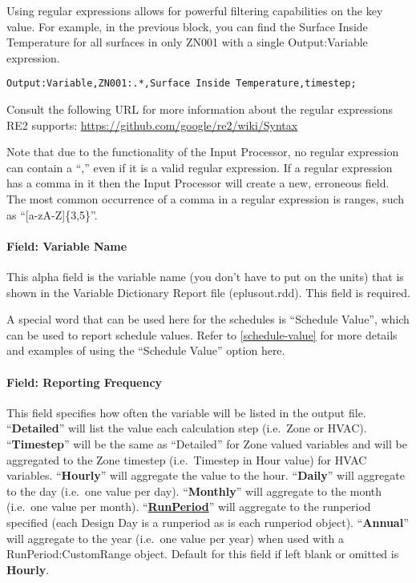 Using regular expressions allows for powerful filtering capabilities on the key value. For example, in the previous block, you can find the Surface Inside Temperature for all surfaces in only ZN001 with a single Output:Variable expression.

\begin{lstlisting}
Output:Variable,ZN001:.*,Surface Inside Temperature,timestep;
\end{lstlisting}

Consult the following URL for more information about the regular expressions RE2 supports: \url{https://github.com/google/re2/wiki/Syntax}

Note that due to the functionality of the Input Processor, no regular expression can contain a ``,'' even if it is a valid regular expression. If a regular expression has a comma in it then the Input Processor will create a new, erroneous field. The most common occurrence of a comma in a regular expression is ranges, such as ``[a-zA-Z]\{3,5\}''.

\paragraph{Field: Variable Name}\label{field-variable-name}

This alpha field is the variable name (you don't have to put on the units) that is shown in the Variable Dictionary Report file (eplusout.rdd). This field is required.

A special word that can be used here for the schedules is ``Schedule Value'', which can be used to report schedule values. Refer to \ref{schedule-value} for more details and examples of using the ``Schedule Value'' option here.

\paragraph{Field: Reporting Frequency}\label{field-reporting-frequency}

This field specifies how often the variable will be listed in the output file. ``\textbf{Detailed}'' will list the value each calculation step (i.e.~Zone or HVAC). ``\textbf{Timestep}'' will be the same as ``Detailed'' for Zone valued variables and will be aggregated to the Zone timestep (i.e.~Timestep in Hour value) for HVAC variables. ``\textbf{Hourly}'' will aggregate the value to the hour. ``\textbf{Daily}'' will aggregate to the day (i.e.~one value per day). ``\textbf{Monthly}'' will aggregate to the month (i.e.~one value per month). ``\textbf{\hyperref[runperiod]{RunPeriod}}'' will aggregate to the runperiod specified (each Design Day is a runperiod as is each runperiod object). ``\textbf{Annual}'' will aggregate to the year  (i.e.~one value per year) when used with a RunPeriod:CustomRange object. Default for this field if left blank or omitted is \textbf{Hourly}.

